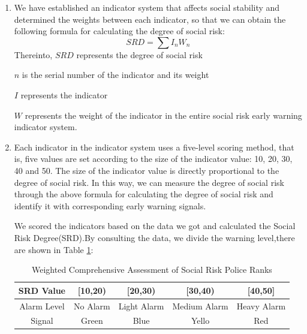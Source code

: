 \documentclass[12pt]{article}  %
\begin{document}
\begin{enumerate}
	\renewcommand{\labelenumi}{\textbf{Step \theenumi}}
\item We have established an indicator system that affects social stability and determined the weights between each indicator, so that we can obtain the following formula for calculating the degree of social risk:
\begin{equation}
	SRD=\sum I_nW_n
	\label{eq}
\end{equation}
Thereinto, $SRD$ represents the degree of social risk

\hspace{4.5em}$n$ is the serial number of the indicator and its weight

\hspace{4.5em}$I$ represents the indicator

\hspace{4.5em}$W$ represents the weight of the indicator in the entire social risk early warning indicator system.
\item Each indicator in the indicator system uses a five-level scoring method, that is, five values are set according to the size of the indicator value: 10, 20, 30, 40 and 50. The size of the indicator value is directly proportional to the degree of social risk. In this way, we can measure the degree of social risk through the above formula for calculating the degree of social risk and identify it with corresponding early warning signals.

We scored the indicators based on the data we got and calculated the Social Risk Degree(SRD).By consulting the data, we divide the warning level,there are shown in Table \ref{srd}:
\begin{table}[!ht]  
    \centering
    \caption{Weighted Comprehensive Assessment of Social Risk Police Ranks}
    \label{srd}
    \begin{tabular}{ccccc}
    \hline
        SRD Value & [10,20) & [20,30) & [30,40) & [40,50] \\ \hline
        Alarm Level & No Alarm & Light Alarm & Medium Alarm & Heavy Alarm \\ 
        Signal & Green & Blue & Yello & Red \\ \hline
    \end{tabular} 
\end{table}








\end{enumerate}
\end{document}
